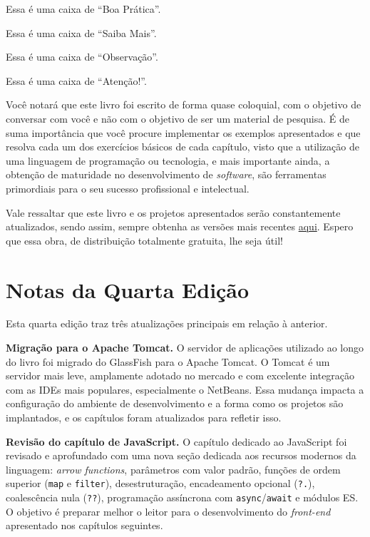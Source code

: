 \begin{boaPratica}
    Essa é uma caixa de ``Boa Prática''.
\end{boaPratica}

\begin{saibaMais}
    Essa é uma caixa de ``Saiba Mais''.
\end{saibaMais}

\begin{observacao}
    Essa é uma caixa de ``Observação''.
\end{observacao}

\begin{atencao}
    Essa é uma caixa de ``Atenção!''.
\end{atencao}

Você notará que este livro foi escrito de forma quase coloquial, com o objetivo de conversar com você e não com o objetivo de ser um material de pesquisa. É de suma importância que você procure implementar os exemplos apresentados e que resolva cada um dos exercícios básicos de cada capítulo, visto que a utilização de uma linguagem de programação ou tecnologia, e mais importante ainda, a obtenção de maturidade no desenvolvimento de \textit{software}, são ferramentas primordiais para o seu sucesso profissional e intelectual.

Vale ressaltar que este livro e os projetos apresentados serão constantemente atualizados, sendo assim, sempre obtenha as versões mais recentes \textcolor{corTema}{\href{https://github.com/davidbuzatto/Livro-Desenvolvimento-de-Aplicacoes-Web-em-Java/releases}{aqui}}. Espero que essa obra, de distribuição totalmente gratuita, lhe seja útil!


\section*{Notas da Quarta Edição}

Esta quarta edição traz três atualizações principais em relação à anterior.

\textbf{Migração para o Apache Tomcat.} O servidor de aplicações utilizado ao longo do livro foi migrado do GlassFish para o Apache Tomcat. O Tomcat é um servidor mais leve, amplamente adotado no mercado e com excelente integração com as IDEs mais populares, especialmente o NetBeans. Essa mudança impacta a configuração do ambiente de desenvolvimento e a forma como os projetos são implantados, e os capítulos foram atualizados para refletir isso.

\textbf{Revisão do capítulo de JavaScript.} O capítulo dedicado ao JavaScript foi revisado e aprofundado com uma nova seção dedicada aos recursos modernos da linguagem: \textit{arrow functions}, parâmetros com valor padrão, funções de ordem superior (\texttt{map} e \texttt{filter}), desestruturação, encadeamento opcional (\texttt{?.}), coalescência nula (\texttt{??}), programação assíncrona com \texttt{async}/\texttt{await} e módulos ES. O objetivo é preparar melhor o leitor para o desenvolvimento do \textit{front-end} apresentado nos capítulos seguintes.

